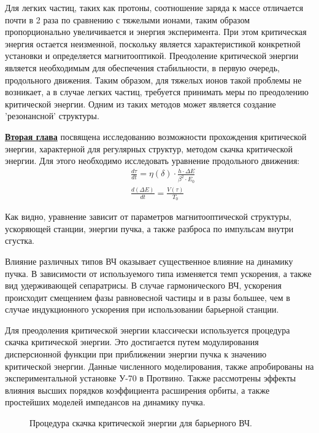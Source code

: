 \par Для легких частиц, таких как протоны, соотношение заряда к массе отличается почти в 2 раза по сравнению с тяжелыми ионами, таким образом пропорционально увеличивается и энергия эксперимента. При этом критическая энергия остается неизменной, поскольку является характеристикой конкретной установки и определяется магнитооптикой. Преодоление критической энергии является необходимым для обеспечения стабильности, в первую очередь, продольного движения. Таким образом, для тяжелых ионов такой проблемы не возникает, а в случае легких частиц, требуется принимать меры по преодолению критической энергии. Одним из таких методов может является создание 'резонансной' структуры. 

\underline{\textbf{Вторая глава}} посвящена исследованию возможности прохождения критической энергии, характерной для регулярных структур, методом скачка критической энергии. Для этого необходимо исследовать уравнение продольного движения:
\[
\begin{aligned}
& \frac{d \tau}{d t}=\eta(\delta) \cdot \frac{h \cdot \Delta E}{\beta^2 \cdot E_0} \\
& \frac{d(\Delta E)}{d t}=\frac{V(\tau)}{T_0}
\end{aligned}
\label{long}
\]

\noindent Как видно, уравнение зависит от параметров магнитооптической структуры, ускоряющей станции, энергии пучка, а также разброса по импульсам внутри сгустка.

\par Влияние различных типов ВЧ оказывает существенное влияние на динамику пучка. В зависимости от используемого типа изменяется темп ускорения, а также вид удерживающей сепаратрисы. В случае гармонического ВЧ, ускорения происходит смещением фазы равновесной частицы и в разы большее, чем в случае индукционного ускорения при использовании барьерной станции.

\par Для преодоления критической энергии классически используется процедура скачка критической энергии. Это достигается путем модулирования дисперсионной функции при приближении энергии пучка к значению критической энергии. Данные численного моделирования, также апробированы на экспериментальной установке У-70 в Протвино. Также рассмотрены эффекты влияния высших порядков коэффициента расширения орбиты, а также простейших моделей импедансов на динамику пучка.

\begin{figure}[h]
    \caption{Процедура скачка критической энергии для барьерного ВЧ.}\label{fig:latex}
\end{figure}

